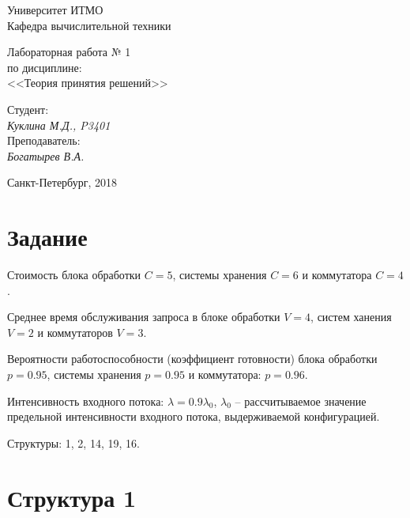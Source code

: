 \documentclass[12pt, a4paper] {ncc}
\begin{document}
\setcounter{figure}{0}
\frenchspacing
\pagestyle{empty}
\begin{center}
                            Университет ИТМО    \\
                        Кафедра вычислительной техники


\end{center}
\begin{center}
			Лабораторная работа № 1\\
		по дисциплине:\\
	<<Теория принятия решений>>
\end{center}
\begin{flushright}
                                    Студент:\\
                                    {\it Куклина М.Д., P3401}\\
                                    Преподаватель: \\
                                    {\it Богатырев В.А. }
\end{flushright}
\begin{center}
                             Санкт-Петербург, 2018
\end{center}
\newpage

\section{Задание}
	Стоимость блока обработки $C = 5$, системы хранения $C = 6$ и коммутатора $C = 4$.

	Среднее время обслуживания запроса в блоке обработки $V = 4$, систем ханения $V = 2$ и коммутаторов $V = 3$.

	Вероятности работоспособности (коэффициент готовности) блока обработки $p = 0.95$,
	системы хранения $p = 0.95$ и коммутатора: $p = 0.96$.

	Интенсивность входного потока: $\lambda = 0.9 \lambda_0$, $\lambda_0$ -- рассчитываемое
	значение предельной интенсивности входного потока, выдерживаемой конфигурацией.

	Структуры: 1, 2, 14, 19, 16.\\

\section{Структура 1}
\end{document}
